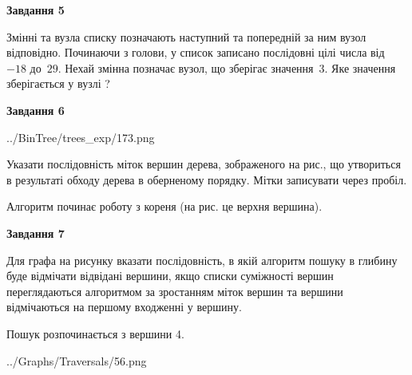 \documentclass[12pt, ukrainian]{article}
\begin{document}
{\begin {large}
{\begin {center}\textbf{Завдання 5}\end {center}}\par
Змінні  та  вузла списку позначають наступний та попередній за ним вузол відповідно. Починаючи з голови, у список записано послідовні цілі числа від~$-18$ до~$29$. Нехай змінна  позначає вузол, що зберігає значення~$3$.
Яке значення зберігається у вузлі  ?\par
\newpage

{\begin {center}\textbf{Завдання 6}\end {center}}\par

\begin{center}
	{../BinTree/trees_exp/173.png}
\end{center}
Указати послідовність міток вершин дерева, зображеного на рис., що утвориться в результаті обходу дерева в оберненому порядку. Мітки записувати через пробіл.\par Алгоритм починає роботу з кореня (на рис. це верхня вершина).\par
\newpage

{\begin {center}\textbf{Завдання 7}\end {center}}\par
Для графа на рисунку вказати послідовність, в якій алгоритм пошуку в глибину буде відмічати відвідані вершини, якщо списки суміжності вершин переглядаються алгоритмом за зростанням міток вершин та вершини відмічаються на першому вход\-женні у вершину.\par
Пошук розпочинається з вершини 4.\par

\begin{center}
	{../Graphs/Traversals/56.png}
\end{center}\par
\newpage


\end{large}}
\end{document}
